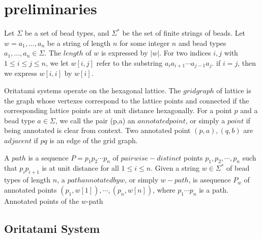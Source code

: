 

\section{preliminaries}
Let $\Sigma$ be a set of bead types, and $\Sigma^*$ be the set of finite strings of beads.
Let $w = a_1 ,...,a_n$ be a string of length $n$ for some integer $n$ and bead types $a_1,...,a_n \in \Sigma$.
The $length$ of $w$ is expressed by $|w|$. 
For two indices $i,j$ with $1\leq i \leq j \leq n$, we let $w[i,j]$ refer to the substring $a_i a_{i+1} \cdots a_{j-1} a_{j}$.
if $i=j$, then we express $w[i,i]$ by $w[i]$.

Oritatami systems operate on the hexagonal lattice. 
The $grid graph$ of lattice is the graph whose vertexes correspond to the lattice points and connected if the corresponding lattice points are at unit distance hexagonally.
For a point $p$ and a bead type $a \in \Sigma$, we call the pair (p,a) an $annotated point$,
or simply a $point$ if being annotated is clear from context.
Two annotated point $(p,a),(q,b)$ are $adjacent$ if $pq$ is an edge of the grid graph.

A $path$ is a sequence $P = p_1 p_2 \cdots p_n$ of $pairwise-distinct$ points $p_1,p_2,\cdots,p_n$
 such that $p_i p_{i+1}$ is at unit distance for all $1 \leq i \leq n$. Given a string $ w \in \Sigma^*$ of bead types of length $n$, a $path annotated by w$, or simply $w-path$, is asequence $P_w$ of annotated points $(p_1,w[1]),\cdots,(p_n,w[n])$, where $p_1 \cdots p_n$ is a path. Annotated points of the $w$-path  
\subsection{Oritatami System}


